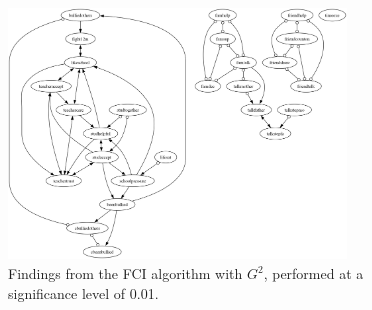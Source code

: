 \begin{figure}[htbp]
    \centering
    \includegraphics[width=0.8\textwidth]{Report/final_report/pictures/FCI_gsq_0.01_all_UA_27_talkmother.png}
    \caption{Findings from the FCI algorithm with $G^2$, performed at a significance level of 0.01.}
    \label{fig:fci_gsq_0.01all_UA_27_talkmother}
\end{figure}
